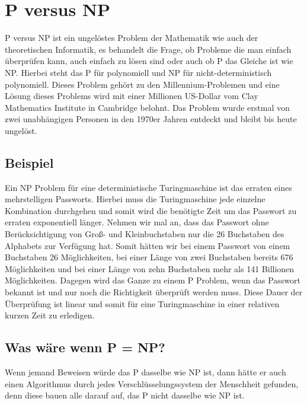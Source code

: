 \section{P versus NP}
\label{P versus NP}
P versus NP ist ein ungelöstes Problem der Mathematik wie auch der theoretischen Informatik, es behandelt die Frage, ob Probleme die man einfach überprüfen kann, auch einfach zu lösen sind oder auch ob P das Gleiche ist wie NP. Hierbei steht das P für polynomiell und NP für nicht-deterministisch polynomiell. Dieses Problem gehört zu den Millennium-Problemen und eine Lösung dieses Problems wird mit einer Millionen US-Dollar vom Clay Mathematics Institute in Cambridge belohnt. Das Problem wurde erstmal von zwei unabhängigen Personen in den 1970er Jahren entdeckt und bleibt bis heute ungelöst.

\subsection{Beispiel}
Ein NP Problem für eine deterministische Turingmaschine ist das erraten eines mehrstelligen Passworts. Hierbei muss die Turingmaschine jede einzelne Kombination durchgehen und somit wird die benötigte Zeit um das Passwort zu erraten exponentiell länger. 
Nehmen wir mal an, dass das Passwort ohne Berücksichtigung von Groß- und Kleinbuchstaben nur die 26 Buchstaben des Alphabets zur Verfügung hat. Somit hätten wir bei einem Passwort von einem Buchstaben 26 Möglichkeiten, bei einer Länge von zwei Buchstaben bereits 676 Möglichkeiten und bei einer Länge von zehn Buchstaben mehr als 141 Billionen Möglichkeiten.
\linebreak
Dagegen wird das Ganze zu einem P Problem, wenn das Passwort bekannt ist und nur noch die Richtigkeit überprüft werden muss. Diese Dauer der Überprüfung ist linear und somit für eine Turingmaschine in einer relativen kurzen Zeit zu erledigen.

\subsection{Was wäre wenn P = NP?}
Wenn jemand Beweisen würde das P dasselbe wie NP ist, dann hätte er auch einen Algorithmus durch jedes Verschlüsselungssystem der Menschheit gefunden, denn diese bauen alle darauf auf, das P nicht dasselbe wie NP ist.
